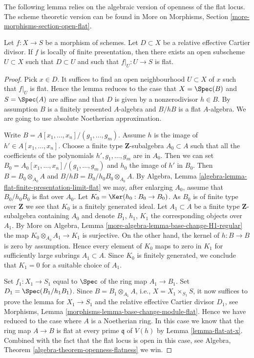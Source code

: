 \noindent
The following lemma relies on the algebraic version of
openness of the flat locus. The scheme theoretic version can be found in
More on Morphisms, Section \ref{more-morphisms-section-open-flat}.

\begin{lemma}
\label{lemma-flat-relative-Cartier-divisor}
Let $f : X \to S$ be a morphism of schemes.
Let $D \subset X$ be a relative effective Cartier divisor.
If $f$ is locally of finite presentation, then there exists
an open subscheme $U \subset X$ such that $D \subset U$ and
such that $f|_U : U \to S$ is flat.
\end{lemma}

\begin{proof}
Pick $x \in D$. It suffices to find an open neighbourhood $U \subset X$
of $x$ such that $f|_U$ is flat. Hence the lemma reduces to the case
that $X = \Spec(B)$ and $S = \Spec(A)$ are affine
and that $D$ is given by a nonzerodivisor $h \in B$. By assumption
$B$ is a finitely presented $A$-algebra and $B/hB$ is a flat
$A$-algebra. We are going to use absolute Noetherian approximation.

\medskip\noindent
Write $B = A[x_1, \ldots, x_n]/(g_1, \ldots, g_m)$. Assume
$h$ is the image of $h' \in A[x_1, \ldots, x_n]$. Choose a finite type
$\mathbf{Z}$-subalgebra $A_0 \subset A$ such that all the coefficients
of the polynomials $h', g_1, \ldots, g_m$ are in $A_0$. Then we can set
$B_0 = A_0[x_1, \ldots, x_n]/(g_1, \ldots, g_m)$ and $h_0$ the image
of $h'$ in $B_0$. Then $B = B_0 \otimes_{A_0} A$ and
$B/hB = B_0/h_0B_0 \otimes_{A_0} A$. By Algebra, Lemma
\ref{algebra-lemma-flat-finite-presentation-limit-flat}
we may, after enlarging $A_0$, assume that $B_0/h_0B_0$ is flat
over $A_0$. Let $K_0 = \Ker(h_0 : B_0 \to B_0)$.
As $B_0$ is of finite type over $\mathbf{Z}$ we see that $K_0$ is
a finitely generated ideal. Let $A_1 \subset A$ be a finite type
$\mathbf{Z}$-subalgebra containing $A_0$ and denote $B_1$, $h_1$, $K_1$
the corresponding objects over $A_1$. By
More on Algebra, Lemma \ref{more-algebra-lemma-base-change-H1-regular}
the map $K_0 \otimes_{A_0} A_1 \to K_1$ is surjective. On the other hand,
the kernel of $h : B \to B$ is zero by assumption. Hence every element
of $K_0$ maps to zero in $K_1$ for sufficiently large subrings
$A_1 \subset A$. Since $K_0$ is finitely generated, we conclude that
$K_1 = 0$ for a suitable choice of $A_1$.

\medskip\noindent
Set $f_1 : X_1 \to S_1$ equal to $\Spec$ of the
ring map $A_1 \to B_1$. Set $D_1 = \Spec(B_1/h_1B_1)$.
Since $B = B_1 \otimes_{A_1} A$, i.e., $X = X_1 \times_{S_1} S$,
it now suffices to prove the lemma for $X_1 \to S_1$ and the relative
effective Cartier divisor $D_1$, see
Morphisms, Lemma \ref{morphisms-lemma-base-change-module-flat}.
Hence we have reduced to the case where $A$ is a Noetherian ring.
In this case we know that the ring map $A \to B$ is flat at every
prime $\mathfrak q$ of $V(h)$ by
Lemma \ref{lemma-flat-at-x}.
Combined with the fact that the flat locus is open in this case, see
Algebra, Theorem \ref{algebra-theorem-openness-flatness}
we win.
\end{proof}

